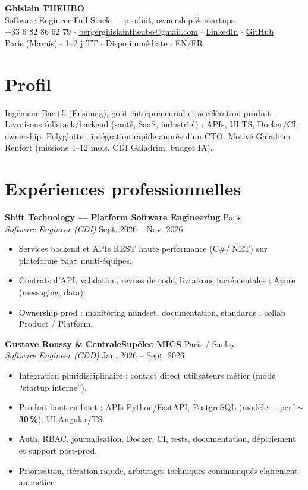 \documentclass[10pt,a4paper]{article}
\begin{document}
\begin{center}
{\LARGE\bfseries Ghislain THEUBO}\\[1pt]
{\large Software Engineer Full Stack --- produit, ownership \& startups}\\[2pt]
+33 6 82 86 62 79 $\cdot$
\href{mailto:bergerghislaintheubo@gmail.com}{bergerghislaintheubo@gmail.com} $\cdot$
\href{https://www.linkedin.com/in/berger-ghislain}{LinkedIn} $\cdot$
\href{https://github.com/Bergerghislain}{GitHub}\\[1pt]
Paris (Marais) $\cdot$ 1--2 j TT $\cdot$ Dispo imm\'ediate $\cdot$ EN/FR
\end{center}

\section{Profil}
Ing\'enieur Bac+5 (Ensimag), go\^ut entrepreneurial et acc\'el\'eration produit. Livraisons fullstack/backend (sant\'e, SaaS, industriel) : APIs, UI TS, Docker/CI, ownership. Polyglotte ; int\'egration rapide aupr\`es d'un CTO. Motiv\'e Galadrim Renfort (missions 4--12 mois, CDI Galadrim, budget IA).

\section{Exp\'eriences professionnelles}
\textbf{Shift Technology --- Platform Software Engineering} \hfill Paris\\
\textit{Software Engineer (CDI)} \hfill Sept. 2026 -- Nov. 2026
\begin{itemize}
  \item Services backend et APIs REST haute performance (C\#/.NET) sur plateforme SaaS multi-\'equipes.
  \item Contrats d'API, validation, revues de code, livraisons incr\'ementales ; Azure (messaging, data).
  \item Ownership prod : monitoring mindset, documentation, standards ; collab Product / Platform.
\end{itemize}

\textbf{Gustave Roussy \& CentraleSup\'elec MICS} \hfill Paris / Saclay\\
\textit{Software Engineer (CDD)} \hfill Jan. 2026 -- Sept. 2026
\begin{itemize}
  \item Int\'egration pluridisciplinaire ; contact direct utilisateurs m\'etier (mode ``startup interne'').
  \item Produit bout-en-bout : APIs Python/FastAPI, PostgreSQL (mod\`ele + perf $\sim$\textbf{30\,\%}), UI Angular/TS.
  \item Auth, RBAC, journalisation, Docker, CI, tests, documentation, d\'eploiement et support post-prod.
  \item Priorisation, it\'eration rapide, arbitrages techniques communiqu\'es clairement au m\'etier.
\end{itemize}
\end{document}
